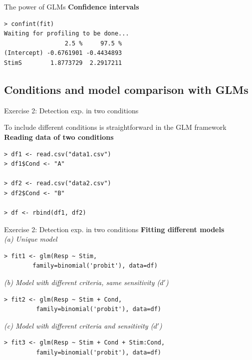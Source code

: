 \documentclass[10pt]{beamer}
\begin{document}
\begin{frame}[fragile]{The power of GLMs}
\textbf{Confidence intervals}
\begin{verbatim}
> confint(fit)
Waiting for profiling to be done...
                 2.5 %     97.5 %
(Intercept) -0.6761901 -0.4434893
StimS        1.8773729  2.2917211
\end{verbatim}


\end{frame}


\subsection{Conditions and model comparison with GLMs}
\begin{frame}[fragile]{Exercise 2: Detection exp. in two conditions}

To include different conditions is straightforward in the GLM framework \\[10pt]

\textbf{Reading data of two conditions}
\begin{verbatim}
> df1 <- read.csv("data1.csv")
> df1$Cond <- "A"

> df2 <- read.csv("data2.csv")
> df2$Cond <- "B"

> df <- rbind(df1, df2)
\end{verbatim}
\end{frame}

\begin{frame}[fragile]{Exercise 2: Detection exp. in two conditions}
\textbf{Fitting different models}\\[10pt]
\textit{(a) Unique model}
\begin{verbatim}
> fit1 <- glm(Resp ~ Stim, 
        family=binomial('probit'), data=df)
\end{verbatim}

\textit{(b) Model with different criteria, same sensitivity ($d'$)}
\begin{verbatim}
> fit2 <- glm(Resp ~ Stim + Cond, 
         family=binomial('probit'), data=df)
\end{verbatim}

\textit{(c) Model with different criteria and sensitivity ($d'$)}
\begin{verbatim}
> fit3 <- glm(Resp ~ Stim + Cond + Stim:Cond, 
         family=binomial('probit'), data=df)
\end{verbatim}

\end{frame}
\end{document}
